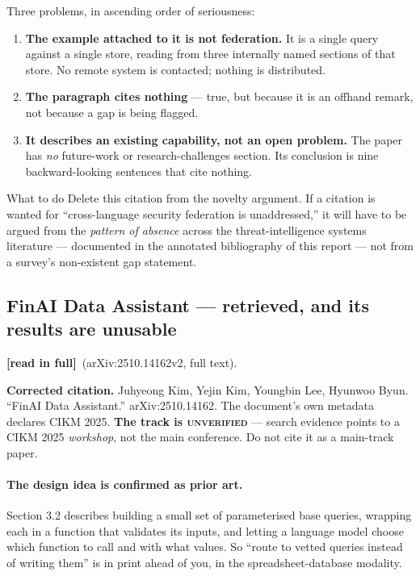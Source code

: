 \documentclass[11pt,a4paper]{article}
\newcommand{\readtag}{\textcolor{standing}{\textbf{[read in full]}}}
\newcommand{\unver}{\textcolor{killed}{\textsc{unverified}}}
\begin{document}
Three problems, in ascending order of seriousness:

\begin{enumerate}
\item \textbf{The example attached to it is not federation.} It is a single query
      against a single store, reading from three internally named sections of that
      store. No remote system is contacted; nothing is distributed.
\item \textbf{The paragraph cites nothing} --- true, but because it is an offhand
      remark, not because a gap is being flagged.
\item \textbf{It describes an existing capability, not an open problem.} The paper
      has \emph{no} future-work or research-challenges section. Its conclusion is
      nine backward-looking sentences that cite nothing.
\end{enumerate}

\begin{alertbox}{What to do}
Delete this citation from the novelty argument. If a citation is wanted for
``cross-language security federation is unaddressed,'' it will have to be argued
from the \emph{pattern of absence} across the threat-intelligence systems
literature --- documented in the annotated bibliography of this report --- not from
a survey's non-existent gap statement.
\end{alertbox}

\subsection{FinAI Data Assistant --- retrieved, and its results are unusable}

\readtag\ (arXiv:2510.14162v2, full text).

\textbf{Corrected citation.} Juhyeong Kim, Yejin Kim, Youngbin Lee, Hyunwoo Byun.
``FinAI Data Assistant.'' arXiv:2510.14162. The document's own metadata declares
CIKM 2025. \textbf{The track is \unver} --- search evidence points to a CIKM 2025
\emph{workshop}, not the main conference. Do not cite it as a main-track paper.

\paragraph{The design idea is confirmed as prior art.} Section 3.2 describes
building a small set of parameterised base queries, wrapping each in a function
that validates its inputs, and letting a language model choose which function to
call and with what values. So ``route to vetted queries instead of writing them''
is in print ahead of you, in the spreadsheet-database modality.
\end{document}
